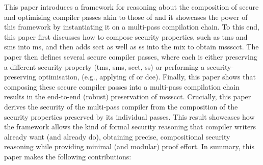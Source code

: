 \documentclass[dvipsnames,conference]{IEEEtran}
\theoremstyle{definition}
\begin{document}
This paper introduces a framework for reasoning about the composition of secure and optimising compiler passes akin to those of  and it showcases the power of this framework by instantiating it on a multi-pass compilation chain.
To this end, this paper first discusses how to compose security properties, such as \gls*{tms} and \gls*{sms} into \gls*{ms}, and then adds \gls*{scct} as well as \gls*{ss} into the mix to obtain \gls*{mssscct}.
The paper then defines several secure compiler passes, where each is either preserving a different security property (\gls*{tms}, \gls*{sms}, \gls*{scct}, \gls*{ss}) or performing a security-preserving optimisation, (e.g., applying \gls*{cf} or \gls*{dce}).
Finally, this paper shows that composing these secure compiler passes into a multi-pass compilation chain results in the end-to-end (robust) preservation of \gls*{mssscct}.
Crucially, this paper derives the security of the multi-pass compiler from the composition of the security properties preserved by its individual passes.
This result showcases how the framework allows the kind of formal security reasoning that compiler writers already want (and already do), obtaining precise, compositional security reasoning while providing minimal (and modular) proof effort.
%
In summary, this paper makes the following contributions:
\end{document}
